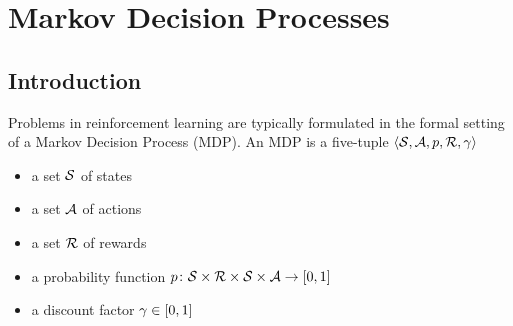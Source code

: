 \chapter{Markov Decision Processes}

\section{Introduction}

Problems in reinforcement learning are typically formulated in the formal
setting of a Markov Decision Process (MDP). An MDP is a five-tuple
$\left \langle \mathcal{S}, \mathcal{A}, p, \mathcal{R}, \gamma \right \rangle$
\begin{itemize}
    \item a set $\mathcal{S}$ of states
    \item a set $\mathcal{A}$ of actions
    \item a set $\mathcal{R}$ of rewards
    \item a probability function
        $p \colon \mathcal{S} \times \mathcal{R} \times \mathcal{S} \times \mathcal{A} \rightarrow [0, 1]$
    \item a discount factor $\gamma \in [0, 1]$
\end{itemize}
